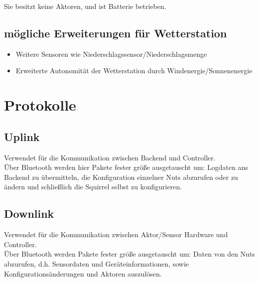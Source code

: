 \documentclass[12pt,a4paper]{article}
\begin{document}
Sie besitzt keine Aktoren, und ist Batterie betrieben.

\subsection{mögliche Erweiterungen für Wetterstation}

\begin{itemize}
	\item Weitere Sensoren wie Niederschlagssensor/Niederschlagsmenge
	\item Erweiterte Autonomität der Wetterstation durch Windenergie/Sonnenenergie
\end{itemize}

\section{Protokolle}

\subsection{Uplink}
\label{subsec:uplink}


Verwendet für die Kommunikation zwischen Backend und Controller.\\
Über Bluetooth werden hier Pakete fester größe ausgetauscht um: Logdaten ans Backend zu übermitteln, die Konfiguration einzelner Nuts abzurufen oder zu ändern und schließlich die Squirrel selbst zu konfigurieren.

\subsection{Downlink}
\label{subsec:downlink}

Verwendet für die Kommunikation zwischen Aktor/Sensor Hardware und Controller.\\
Über Bluetooth werden Pakete fester größe ausgetauscht um: Daten von den Nuts abzurufen, d.h. Sensordaten und Geräteinformationen, sowie Konfigurationsänderungen und Aktoren auszulösen. 
\end{document}
